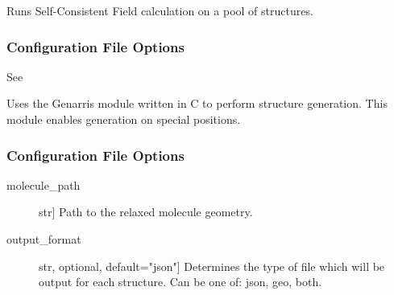 \documentclass[letterpaper,10pt,english]{sphinxmanual}
\begin{document}
\begin{fulllineitems}
\begin{fulllineitems}
\begin{description}
\end{description}

\end{fulllineitems}


\begin{fulllineitems}
\label{\detokenize{index:Genarris.genarris_master.Genarris.FHI_Aims_Energy_Evaluation}}
Runs Self-Consistent Field calculation on a pool of structures.
\subsubsection*{Configuration File Options}

See {\hyperref[\detokenize{index:Genarris.genarris_master.Genarris.Run_FHI_Aims_Batch}]{}}

\end{fulllineitems}


\begin{fulllineitems}
\label{\detokenize{index:Genarris.genarris_master.Genarris.Pygenarris_Structure_Generation}}
Uses the Genarris module written in C to perform structure generation.
This module enables generation on special positions.
\subsubsection*{Configuration File Options}
\begin{description}
\item[{molecule\_path}] \leavevmode{[}str{]}
Path to the relaxed molecule geometry.

\item[{output\_format}] \leavevmode{[}str, optional, default="json"{]}
Determines the type of file which will be output for each
structure. Can be one of: json, geo, both.


\end{description}
\end{fulllineitems}
\end{fulllineitems}
\end{document}
